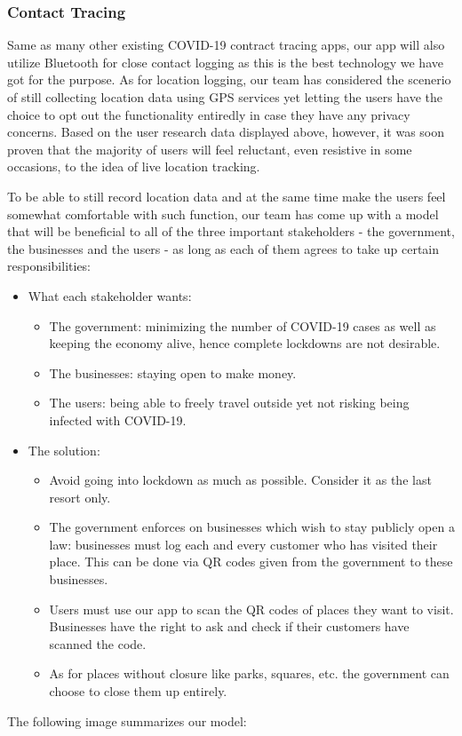   \subsubsection{Contact Tracing}
  \par Same as many other existing COVID-19 contract tracing apps, our app will also utilize Bluetooth for close contact logging as this is the best technology we have got for the purpose. As for location logging, our team has considered the scenerio of still collecting location data using GPS services yet letting the users have the choice to opt out the functionality entiredly in case they have any privacy concerns. Based on the user research data displayed above, however, it was soon proven that the majority of users will feel reluctant, even resistive in some occasions, to the idea of live location tracking.
  \par To be able to still record location data and at the same time make the users feel somewhat comfortable with such function, our team has come up with a model that will be beneficial to all of the three important stakeholders - the government, the businesses and the users - as long as each of them agrees to take up certain responsibilities:
  \begin{itemize}
    \item What each stakeholder wants:
      \begin{itemize}
        \item The government: minimizing the number of COVID-19 cases as well as keeping the economy alive, hence complete lockdowns are not desirable.
        \item The businesses: staying open to make money.
        \item The users: being able to freely travel outside yet not risking being infected with COVID-19.
      \end{itemize}
    \item The solution:
      \begin{itemize}
        \item Avoid going into lockdown as much as possible. Consider it as the last resort only.
        \item The government enforces on businesses which wish to stay publicly open a law: businesses must log each and every customer who has visited their place. This can be done via QR codes given from the government to these businesses.
        \item Users must use our app to scan the QR codes of places they want to visit. Businesses have the right to ask and check if their customers have scanned the code.
        \item As for places without closure like parks, squares, etc. the government can choose to close them up entirely.
      \end{itemize}
  \end{itemize}
  \par The following image summarizes our model:

